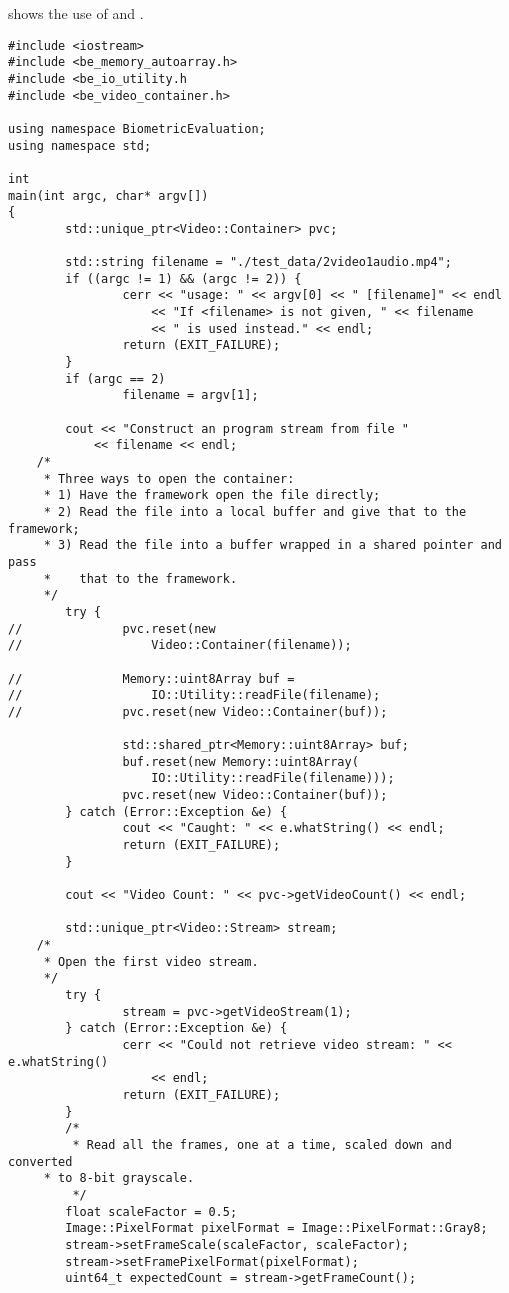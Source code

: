  shows the use of  and .

\begin{lstlisting}[caption={Using the Video Framework}, label=lst:videouse]
#include <iostream>
#include <be_memory_autoarray.h>
#include <be_io_utility.h
#include <be_video_container.h>

using namespace BiometricEvaluation;
using namespace std;

int
main(int argc, char* argv[])
{
        std::unique_ptr<Video::Container> pvc;

        std::string filename = "./test_data/2video1audio.mp4";
        if ((argc != 1) && (argc != 2)) {
                cerr << "usage: " << argv[0] << " [filename]" << endl
                    << "If <filename> is not given, " << filename
                    << " is used instead." << endl;
                return (EXIT_FAILURE);
        }
        if (argc == 2)
                filename = argv[1];

        cout << "Construct an program stream from file "
            << filename << endl;
	/*
	 * Three ways to open the container:
	 * 1) Have the framework open the file directly;
	 * 2) Read the file into a local buffer and give that to the framework;
	 * 3) Read the file into a buffer wrapped in a shared pointer and pass
	 *    that to the framework.
	 */
        try {
//              pvc.reset(new
//                  Video::Container(filename));

//              Memory::uint8Array buf =
//                  IO::Utility::readFile(filename);
//              pvc.reset(new Video::Container(buf));

                std::shared_ptr<Memory::uint8Array> buf;
                buf.reset(new Memory::uint8Array(
                    IO::Utility::readFile(filename)));
                pvc.reset(new Video::Container(buf));
        } catch (Error::Exception &e) {
                cout << "Caught: " << e.whatString() << endl;
                return (EXIT_FAILURE);
        }

        cout << "Video Count: " << pvc->getVideoCount() << endl;

        std::unique_ptr<Video::Stream> stream;
	/*
	 * Open the first video stream.
	 */
        try {
                stream = pvc->getVideoStream(1);
        } catch (Error::Exception &e) {
                cerr << "Could not retrieve video stream: " << e.whatString()
                    << endl;
                return (EXIT_FAILURE);
        }
        /*
         * Read all the frames, one at a time, scaled down and converted
	 * to 8-bit grayscale.
         */
        float scaleFactor = 0.5;
        Image::PixelFormat pixelFormat = Image::PixelFormat::Gray8;
        stream->setFrameScale(scaleFactor, scaleFactor);
        stream->setFramePixelFormat(pixelFormat);
        uint64_t expectedCount = stream->getFrameCount();


\end{lstlisting}
